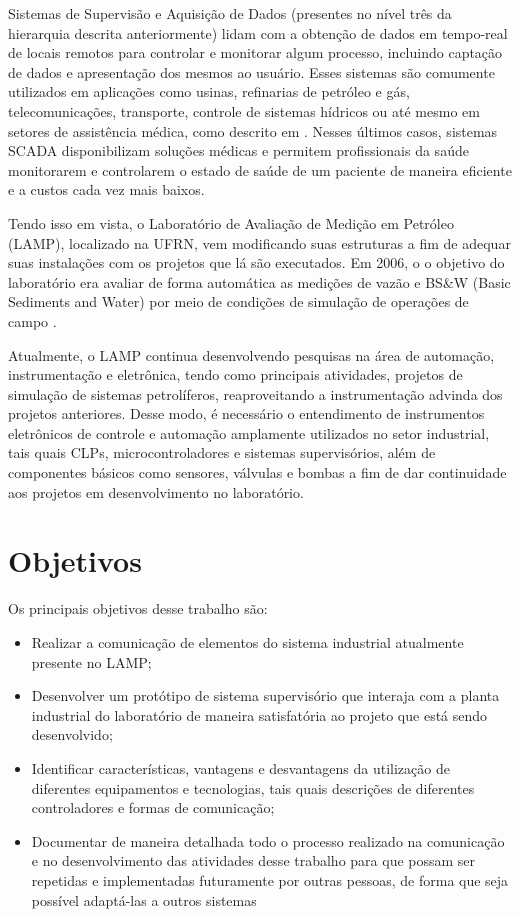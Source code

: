 Sistemas de Supervisão e Aquisição de Dados (presentes no nível três da hierarquia descrita anteriormente) lidam com a obtenção de dados em tempo-real de locais remotos para controlar e monitorar algum processo, incluindo captação de dados e apresentação dos mesmos ao usuário. Esses sistemas são comumente utilizados em aplicações como usinas, refinarias de petróleo e gás, telecomunicações, transporte, controle de sistemas hídricos ou até mesmo em setores de assistência médica, como descrito em \cite{silva2015mobile}. Nesses últimos casos, sistemas SCADA disponibilizam soluções médicas e permitem profissionais da saúde monitorarem e controlarem o estado de saúde de um paciente de maneira eficiente e a custos cada vez mais baixos.

Tendo isso em vista, o Laboratório de Avaliação de Medição em Petróleo (LAMP), localizado na UFRN, vem modificando suas estruturas a fim de adequar suas instalações com os projetos que lá são executados. Em 2006, o o objetivo do laboratório era avaliar de forma automática as medições de vazão e BS\&W (Basic Sediments and Water) por meio de condições de simulação de operações de campo \cite{salazar2006instrumentaccao}. 

Atualmente, o LAMP continua desenvolvendo pesquisas na área de automação, instrumentação e eletrônica, tendo como principais atividades, projetos de simulação de sistemas petrolíferos, reaproveitando a instrumentação advinda dos projetos anteriores. Desse modo, é necessário o entendimento de instrumentos eletrônicos de controle e automação amplamente utilizados no setor industrial, tais quais CLPs, microcontroladores e sistemas supervisórios,  além de componentes básicos como sensores, válvulas e bombas a fim de dar continuidade aos projetos em desenvolvimento no laboratório.

\section{Objetivos}

Os principais objetivos desse trabalho são:

\begin{itemize}
\item Realizar a comunicação de elementos do sistema industrial atualmente presente no LAMP;
\item Desenvolver um protótipo de sistema supervisório que interaja com a planta industrial do laboratório de maneira satisfatória ao projeto que está sendo desenvolvido;
\item Identificar características, vantagens e desvantagens da utilização de diferentes equipamentos e tecnologias, tais quais descrições de diferentes controladores e formas de comunicação;
\item Documentar de maneira detalhada todo o processo realizado na comunicação e no desenvolvimento das atividades desse trabalho para que possam ser repetidas e implementadas futuramente por outras pessoas, de forma que seja possível adaptá-las a outros sistemas
\end{itemize}



